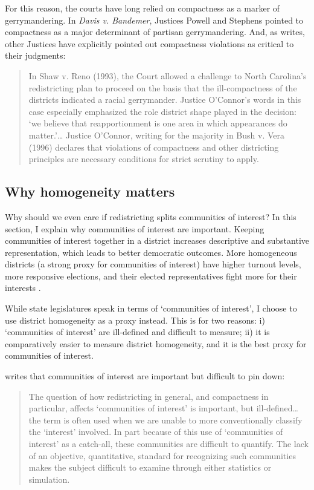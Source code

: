 \documentclass[]{article}
\begin{document}
For this reason, the courts have long relied on compactness as a marker
of gerrymandering. In \emph{Davis v. Bandemer}, Justices Powell and
Stephens pointed to compactness as a major determinant of partisan
gerrymandering. And, as \cite{altman1998} writes, other Justices have
explicitly pointed out compactness violations as critical to their
judgments:

\begin{quote}
In Shaw v. Reno (1993), the Court allowed a challenge to North
Carolina's redistricting plan to proceed on the basis that the
ill-compactness of the districts indicated a racial gerrymander. Justice
O'Connor's words in this case especially emphasized the role district
shape played in the decision: `we believe that reapportionment is one
area in which appearances do matter.'\ldots{} Justice O'Connor, writing
for the majority in Bush v. Vera (1996) declares that violations of
compactness and other districting principles are necessary conditions
for strict scrutiny to apply.
\end{quote}

\hypertarget{why-homogeneity-matters}{%
\subsection{Why homogeneity matters}\label{why-homogeneity-matters}}

Why should we even care if redistricting splits communities of interest?
In this section, I explain why communities of interest are important.
Keeping communities of interest together in a district increases
descriptive and substantive representation, which leads to better
democratic outcomes. More homogeneous districts (a strong proxy for
communities of interest) have higher turnout levels, more responsive
elections, and their elected representatives fight more for their
interests \citep{ogrady2018}.

While state legislatures speak in terms of `communities of interest', I
choose to use district homogeneity as a proxy instead. This is for two
reasons: i) `communities of interest' are ill-defined and difficult to
measure; ii) it is comparatively easier to measure district homogeneity,
and it is the best proxy for communities of interest.

\citeauthor{altman1998} writes that communities of interest are
important but difficult to pin down:

\begin{quote}
The question of how redistricting in general, and compactness in
particular, affects `communities of interest' is important, but
ill-defined\ldots{} the term is often used when we are unable to more
conventionally classify the `interest' involved. In part because of this
use of `communities of interest' as a catch-all, these communities are
difficult to quantify. The lack of an objective, quantitative, standard
for recognizing such communities makes the subject difficult to examine
through either statistics or simulation.
\end{quote}
\end{document}
